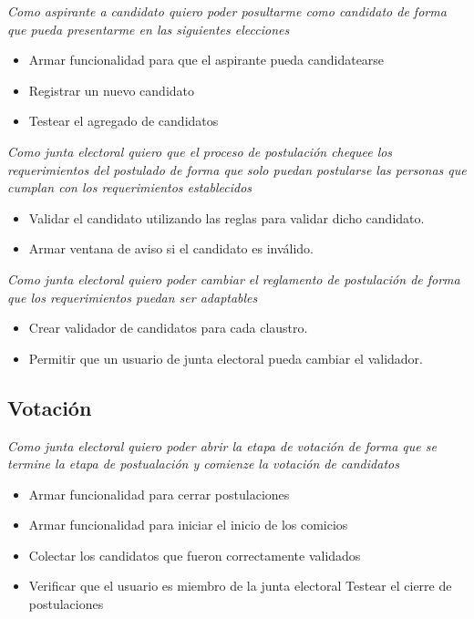 \medskip

\textsl{Como aspirante a candidato quiero poder posultarme como candidato de forma que pueda presentarme en las siguientes elecciones}
\begin{itemize}
 \item Armar funcionalidad para que el aspirante pueda candidatearse
 \item Registrar un nuevo candidato
 \item Testear el agregado de candidatos
\end{itemize}

\medskip

\textsl{Como junta electoral quiero que el proceso de postulaci\'on chequee los requerimientos del postulado de forma que solo puedan postularse las personas que cumplan con los requerimientos establecidos}
\begin{itemize}
 \item Validar el candidato utilizando las reglas para validar dicho candidato.
 \item Armar ventana de aviso si el candidato es inv\'alido.
\end{itemize}

\medskip
\textsl{Como junta electoral quiero poder cambiar el reglamento de postulaci\'on de forma que los requerimientos puedan ser adaptables}
\begin{itemize}
 \item Crear validador de candidatos para cada claustro.
 \item Permitir que un usuario de junta electoral pueda cambiar el validador.
\end{itemize}

\bigskip

\subsection*{Votaci\'on}

\textsl{Como junta electoral quiero poder abrir la etapa de votaci\'on de forma que se termine la etapa de postualaci\'on y comienze la votaci\'on de candidatos}
\begin{itemize}
 \item Armar funcionalidad para cerrar postulaciones
 \item Armar funcionalidad para iniciar el inicio de los comicios
 \item Colectar los candidatos que fueron correctamente validados 
 \item Verificar que el usuario es miembro de la junta electoral
 \iten Testear el cierre de postulaciones
\end{itemize}

